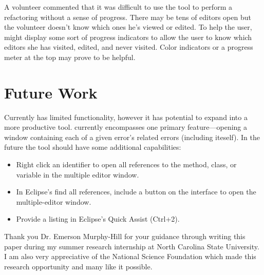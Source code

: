 \documentclass{sigplanconf}
\begin{document}
A volunteer commented that it was difficult to use the tool to perform
a refactoring without a sense of progress. There may be tens of editors
open but the volunteer doesn't know which ones he's viewed or edited.
To help the user, \pname{} might display
some sort of progress indicators to allow the user to know which editors
she has visited, edited, and never visited. Color indicators or a progress
meter at the top may prove to be helpful.

\section{Future Work}
Currently \pname{} has limited functionality, however it has potential to expand
into a more productive tool. \pname{} currently encompasses one primary
feature---opening a window containing each of a given error's related errors
(including iteself). In the future the tool should have some additional
capabilities:

\begin{itemize}
  \item Right click an identifier to open all references to the method, class,
      or variable in the multiple editor window.
  \item In Eclipse's find all references, include a button on the interface
      to open the multiple-editor window.
  \item Provide a listing in Eclipse's Quick Assist (Ctrl+2).
\end{itemize}

\appendix
% 

\acks
Thank you Dr. Emerson Murphy-Hill for your guidance through writing this
paper during my summer research internship at North Carolina State University.
I am also very appreciative of the National Science Foundation which made this
research opportunity and many like it possible.





\softraggedright

\end{document}
